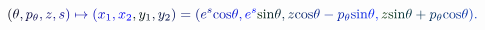 \documentclass[12pt]{article}
\begin{document}
\makeatletter
\renewcommand*{\@textcolor}[3]{%
  \protect\leavevmode
  \begingroup
    \color#1{#2}#3%
  \endgroup
}
\makeatother
\begin{displaymath}
\mathcolor[RGB]{0,0,15}{(} \mathcolor[RGB]{0,0,30}{\theta} \mathcolor[RGB]{0,0,45}{,} \mathcolor[RGB]{0,0,60}{p} _ { \mathcolor[RGB]{0,0,75}{\theta} } \mathcolor[RGB]{0,0,90}{,} \mathcolor[RGB]{0,0,105}{z} \mathcolor[RGB]{0,0,120}{,} \mathcolor[RGB]{0,0,135}{s} \mathcolor[RGB]{0,0,150}{)} \mathcolor[RGB]{0,0,165}{\mapsto} \mathcolor[RGB]{0,0,180}{(} \mathcolor[RGB]{0,0,195}{x} _ { \mathcolor[RGB]{0,0,210}{1} } \mathcolor[RGB]{0,0,225}{,} \mathcolor[RGB]{0,0,240}{x} _ { \mathcolor[RGB]{0,0,255}{2} } \mathcolor[RGB]{0,15,0}{,} \mathcolor[RGB]{0,15,15}{y} _ { \mathcolor[RGB]{0,15,30}{1} } \mathcolor[RGB]{0,15,45}{,} \mathcolor[RGB]{0,15,60}{y} _ { \mathcolor[RGB]{0,15,75}{2} } \mathcolor[RGB]{0,15,90}{)} \mathcolor[RGB]{0,15,105}{=} \mathcolor[RGB]{0,15,120}{(} \mathcolor[RGB]{0,15,135}{e} ^ { \mathcolor[RGB]{0,15,150}{s} } \mathrm { \mathcolor[RGB]{0,15,165}{c} \mathcolor[RGB]{0,15,180}{o} \mathcolor[RGB]{0,15,195}{s} } \mathcolor[RGB]{0,15,210}{\theta} \mathcolor[RGB]{0,15,225}{,} \mathcolor[RGB]{0,15,240}{e} ^ { \mathcolor[RGB]{0,15,255}{s} } \mathrm { \mathcolor[RGB]{0,30,0}{s} \mathcolor[RGB]{0,30,15}{i} \mathcolor[RGB]{0,30,30}{n} } \mathcolor[RGB]{0,30,45}{\theta} \mathcolor[RGB]{0,30,60}{,} \mathcolor[RGB]{0,30,75}{z} \mathrm { \mathcolor[RGB]{0,30,90}{c} \mathcolor[RGB]{0,30,105}{o} \mathcolor[RGB]{0,30,120}{s} } \mathcolor[RGB]{0,30,135}{\theta} \mathcolor[RGB]{0,30,150}{-} \mathcolor[RGB]{0,30,165}{p} _ { \mathcolor[RGB]{0,30,180}{\theta} } \mathrm { \mathcolor[RGB]{0,30,195}{s} \mathcolor[RGB]{0,30,210}{i} \mathcolor[RGB]{0,30,225}{n} } \mathcolor[RGB]{0,30,240}{\theta} \mathcolor[RGB]{0,30,255}{,} \mathcolor[RGB]{0,45,0}{z} \mathrm { \mathcolor[RGB]{0,45,15}{s} \mathcolor[RGB]{0,45,30}{i} \mathcolor[RGB]{0,45,45}{n} } \mathcolor[RGB]{0,45,60}{\theta} \mathcolor[RGB]{0,45,75}{+} \mathcolor[RGB]{0,45,90}{p} _ { \mathcolor[RGB]{0,45,105}{\theta} } \mathrm { \mathcolor[RGB]{0,45,120}{c} \mathcolor[RGB]{0,45,135}{o} \mathcolor[RGB]{0,45,150}{s} } \mathcolor[RGB]{0,45,165}{\theta} \mathcolor[RGB]{0,45,180}{)} \mathcolor[RGB]{0,45,195}{.}
\end{displaymath}
\end{document}

